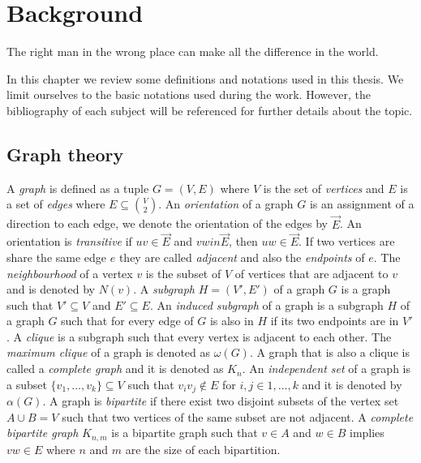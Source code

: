 \chapter{Background}
\label{chap:background}

\begin{fquote}
  The right man in the wrong place can make all the difference in the world.
\end{fquote}

In this chapter we review some definitions and notations used in this thesis. We limit ourselves to the basic notations used during the work. However, the bibliography of each subject will be referenced for further details about the topic.


%
%
%

\section{Graph theory}

A \emph{graph} is defined as a tuple $G = (V,E)$ where $V$ is the set of \emph{vertices} and $E$ is a set of \emph{edges} where $E \subseteq \binom{V}{2}$. An \emph{orientation} of a graph $G$ is an assignment of a direction to each edge, we denote the orientation of the edges by $\overrightarrow{E}$. An orientation is \emph{transitive} if $uv \in \overrightarrow{E}$ and $vw in \overrightarrow{E}$, then $uw \in \overrightarrow{E}$. If two vertices are share the same edge $e$ they are called \emph{adjacent} and also the \emph{endpoints} of $e$. The \emph{neighbourhood} of a vertex $v$ is the subset of $V$ of vertices that are adjacent to $v$ and is denoted by $N(v)$. A \emph{subgraph} $H = (V', E')$ of a graph $G$ is a graph such that $V' \subseteq V$ and $E' \subseteq E$. An \emph{induced subgraph} of a graph is a subgraph $H$ of a graph $G$ such that for every edge of $G$ is also in $H$ if its two endpoints are in $V'$. A \emph{clique} is a subgraph such that every vertex is adjacent to each other. The \emph{maximum clique} of a graph is denoted as $\omega(G)$. A graph that is also a clique is called a \emph{complete graph} and it is denoted as $K_n$. An \emph{independent set} of a graph is a subset $\{v_1, \dots, v_k\} \subseteq V$ such that $v_iv_j \notin E$ for $i,j \in {1, \dots, k}$ and it is denoted by $\alpha(G)$. A graph is \emph{bipartite} if there exist two disjoint subsets of the vertex set $A \cup B = V$ such that two vertices of the same subset are not adjacent. A \emph{complete bipartite graph} $K_{n,m}$ is a bipartite graph such that $v \in A$ and $w \in B$ implies $vw \in E$ where $n$ and $m$ are the size of each bipartition.

